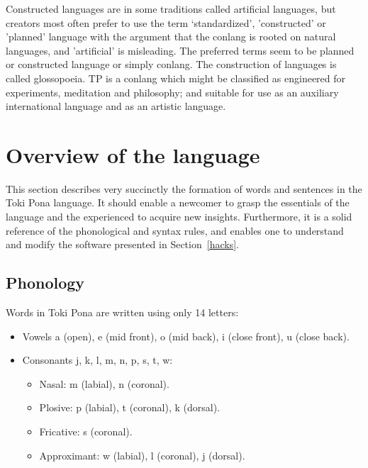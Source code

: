 \documentclass{article}
\begin{document}
Constructed languages are in some traditions called artificial
languages, but creators most often prefer to use the term
`standardized', 'constructed'
or 'planned' language with the argument that the conlang
is rooted on natural languages,
and 'artificial' is misleading.
The preferred terms seem to be planned or constructed language
or simply conlang.
The construction of languages is called glossopoeia.
TP is a conlang which might be classified
as engineered for experiments, meditation and philosophy;
and suitable for use as an auxiliary international language and
as an artistic language.~\cite{conlanWikip,artlanWikip}



\section{Overview of the language}\label{basics}
This section describes very succinctly the formation of
words and sentences in the Toki Pona language.
It should enable a newcomer to grasp the essentials
of the language and the experienced to
acquire new insights.
Furthermore, it is a solid reference of the phonological and syntax
rules, and enables one to understand and modify the software presented
in Section~\ref{hacks}.

\subsection{Phonology}\label{phonology}
Words in Toki Pona are written using only 14 letters:
\begin{itemize}
  \item Vowels a (open), e (mid front), o (mid back), i (close front),
    u (close back).
  \item Consonants j, k, l, m, n, p, s, t, w:
    \begin{itemize}
      \item Nasal: m (labial), n (coronal).
      \item Plosive: p (labial), t (coronal), k (dorsal).
      \item Fricative: s (coronal).
      \item Approximant: w (labial), l (coronal), j (dorsal).
    \end{itemize}
\end{itemize}
\end{document}
